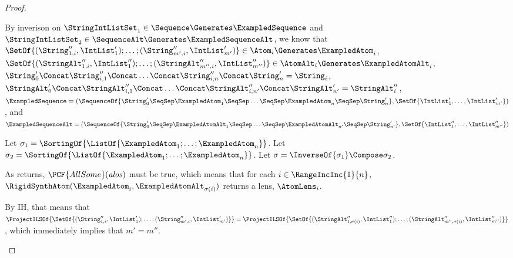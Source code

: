 \documentclass[acmsmall,screen]{acmart}
\begin{document}
\begin{proof}
\begin{case}[sequence]
    By inverison on 
    $\StringIntListSet_1 \in \Sequence \Generates \ExampledSequence$ and
    $\StringIntListSet_2 \in \SequenceAlt \Generates \ExampledSequenceAlt$,
    we know that\\
    $\SetOf{(\String_{1,i}'',\IntList_1');\ldots;(\String_{m',i}'',\IntList_{m'}')}
    \in \Atom_i \Generates \ExampledAtom_i$,\\
    $\SetOf{(\StringAlt_{1,i}'',\IntList_1'');\ldots;(\StringAlt_{m'',i}'',\IntList_{m''}'')}
    \in \AtomAlt_i \Generates \ExampledAtomAlt_i$,\\
    $\String_0'\Concat\String_{i,1}''\Concat\ldots\Concat\String_{i,n}''\Concat\String_n' = \String_i$,\\
    $\StringAlt_0'\Concat\StringAlt_{i,1}''\Concat\ldots\Concat\StringAlt_{i,n'}''\Concat\StringAlt_{n'}' = \StringAlt_i''$,\\
    $\ExampledSequence =
    (\SequenceOf{\String_0' \SeqSep \ExampledAtom_1 \SeqSep \ldots \SeqSep
      \ExampledAtom_n \SeqSep \String_n'},\SetOf{\IntList_1',\ldots,\IntList_{m'}'})$, and\\
    $\ExampledSequenceAlt =
    (\SequenceOf{\String_0' \SeqSep \ExampledAtomAlt_{1} \SeqSep \ldots \SeqSep
      \ExampledAtomAlt_{n'} \SeqSep \String_{n'}'},\SetOf{\IntList_1'',\ldots,\IntList_{m''}''})$

    Let $\sigma_1 =
    \SortingOf{\ListOf{\ExampledAtom_1;\ldots;\ExampledAtom_n}}$.
    Let $\sigma_2 =
    \SortingOf{\ListOf{\ExampledAtom_1;\ldots;\ExampledAtom_n}}$.
    Let $\sigma = \InverseOf{\sigma_1} \Compose \sigma_2$.

    As \RigidSynthSequence{} returns, $\PCF{AllSome}(\mathit{alos})$ must be true, which
    means that for each $i\in\RangeIncInc{1}{n}$,
    $\RigidSynthAtom(\ExampledAtom_i,\ExampledAtomAlt_{\sigma(i)})$ returns a
    lens, $\AtomLens_i$.
    
    By IH, that means that\\
    $\ProjectILSOf{\SetOf{(\String_{1,i}'',\IntList_1');\ldots;(\String_{m',i}'',\IntList_{m'}')}}\\
    =
    \ProjectILSOf{\SetOf{(\StringAlt_{1,\sigma(i)}'',\IntList_1'');\ldots;(\StringAlt_{m'',\sigma(i)}'',\IntList_{m''}'')}}$,
    which immediately implies that $m' = m''$.
    

\end{case}
\end{proof}
\end{document}
